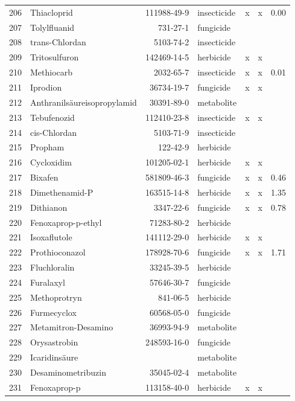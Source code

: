 \begin{longtable}{lp{3cm}rlp{0.5cm}p{0.5cm}p{1cm}}
  206 & Thiacloprid & 111988-49-9 & insecticide & x & x & 0.00 \\ 
  207 & Tolylfluanid & 731-27-1 & fungicide &  &  &  \\ 
  208 & trans-Chlordan & 5103-74-2 & insecticide &  &  &  \\ 
  209 & Tritosulfuron & 142469-14-5 & herbicide & x & x &  \\ 
  210 & Methiocarb & 2032-65-7 & insecticide & x & x & 0.01 \\ 
  211 & Iprodion & 36734-19-7 & fungicide & x & x &  \\ 
  212 & Anthranilsäureisopropylamid & 30391-89-0 & metabolite &  &  &  \\ 
  213 & Tebufenozid & 112410-23-8 & insecticide & x & x &  \\ 
  214 & cis-Chlordan & 5103-71-9 & insecticide &  &  &  \\ 
  215 & Propham & 122-42-9 & herbicide &  &  &  \\ 
  216 & Cycloxidim & 101205-02-1 & herbicide & x & x &  \\ 
  217 & Bixafen & 581809-46-3 & fungicide & x & x & 0.46 \\ 
  218 & Dimethenamid-P & 163515-14-8 & herbicide & x & x & 1.35 \\ 
  219 & Dithianon & 3347-22-6 & fungicide & x & x & 0.78 \\ 
  220 & Fenoxaprop-p-ethyl & 71283-80-2 & herbicide &  &  &  \\ 
  221 & Isoxaflutole & 141112-29-0 & herbicide & x & x &  \\ 
  222 & Prothioconazol & 178928-70-6 & fungicide & x & x & 1.71 \\ 
  223 & Fluchloralin & 33245-39-5 & herbicide &  &  &  \\ 
  224 & Furalaxyl & 57646-30-7 & fungicide &  &  &  \\ 
  225 & Methoprotryn & 841-06-5 & herbicide &  &  &  \\ 
  226 & Furmecyclox & 60568-05-0 & fungicide &  &  &  \\ 
  227 & Metamitron-Desamino & 36993-94-9 & metabolite &  &  &  \\ 
  228 & Orysastrobin & 248593-16-0 & fungicide &  &  &  \\ 
  229 & Icaridinsäure &  & metabolite &  &  &  \\ 
  230 & Desaminometribuzin & 35045-02-4 & metabolite &  &  &  \\ 
  231 & Fenoxaprop-p & 113158-40-0 & herbicide & x & x &  \\ 

\end{longtable}
